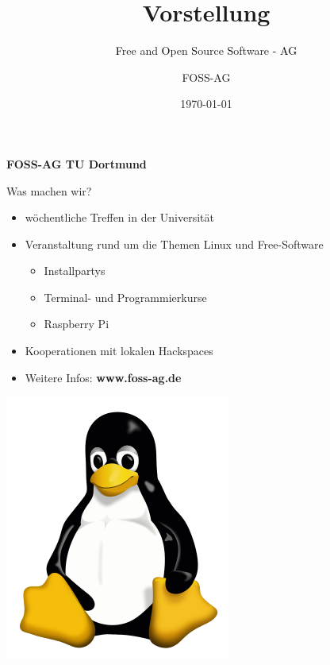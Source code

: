 \documentclass{beamer}
\author{FOSS-AG}
\date{\today}
\title{Vorstellung}
\subtitle{\textcolor{black}{F}ree and \textcolor{black}{O}pen \textcolor{black}{S}ource \textcolor{black}{S}oftware \textcolor{black}{- AG}}
\begin{document}
	
	\begin{frame}
		\begin{center}
		{\large \textbf{FOSS-AG TU Dortmund}}
		\end{center}
	
		\vspace{0.2cm}
		\begin{minipage}{0.56\linewidth}
			Was machen wir?
			\begin{itemize}
				\item wöchentliche Treffen in der Universität
				\item Veranstaltung rund um die Themen Linux und Free-Software
				\begin{itemize}
					\item Installpartys
					\item Terminal- und Programmierkurse
					\item Raspberry Pi
				\end{itemize}
				\item Kooperationen mit lokalen Hackspaces
				\item Weitere Infos: \textbf{www.foss-ag.de}
			\end{itemize}
		\end{minipage}
	
		\hspace*{0.8\linewidth}
		\begin{minipage}{0.35\linewidth}
			\includegraphics[scale=0.2]{resources/tux}
		\end{minipage}
	\end{frame}
\end{document}
